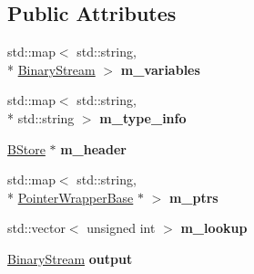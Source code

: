 \subsection*{Public Attributes}
\begin{DoxyCompactItemize}
\item 
\hypertarget{classBStore_a6c7784678d533216eaa7fe06b9bbbe51}{std\-::map$<$ std\-::string, \\*
\hyperlink{classBinaryStream}{Binary\-Stream} $>$ {\bfseries m\-\_\-variables}}\label{classBStore_a6c7784678d533216eaa7fe06b9bbbe51}

\item 
\hypertarget{classBStore_a02248903b5baa5c51824dd0ecd704e98}{std\-::map$<$ std\-::string, \\*
std\-::string $>$ {\bfseries m\-\_\-type\-\_\-info}}\label{classBStore_a02248903b5baa5c51824dd0ecd704e98}

\item 
\hypertarget{classBStore_abe9c88c37b0598f56fc7e179a7cd272d}{\hyperlink{classBStore}{B\-Store} $\ast$ {\bfseries m\-\_\-header}}\label{classBStore_abe9c88c37b0598f56fc7e179a7cd272d}

\item 
\hypertarget{classBStore_a189a099a670986e8b4beb16e006e6a07}{std\-::map$<$ std\-::string, \\*
\hyperlink{classPointerWrapperBase}{Pointer\-Wrapper\-Base} $\ast$ $>$ {\bfseries m\-\_\-ptrs}}\label{classBStore_a189a099a670986e8b4beb16e006e6a07}

\item 
\hypertarget{classBStore_a1c35b535617aa15efe5803e9718a1943}{std\-::vector$<$ unsigned int $>$ {\bfseries m\-\_\-lookup}}\label{classBStore_a1c35b535617aa15efe5803e9718a1943}

\item 
\hypertarget{classBStore_a0d3b08dfb9aa0147a14f14d853655371}{\hyperlink{classBinaryStream}{Binary\-Stream} {\bfseries output}}\label{classBStore_a0d3b08dfb9aa0147a14f14d853655371}

\end{DoxyCompactItemize}


